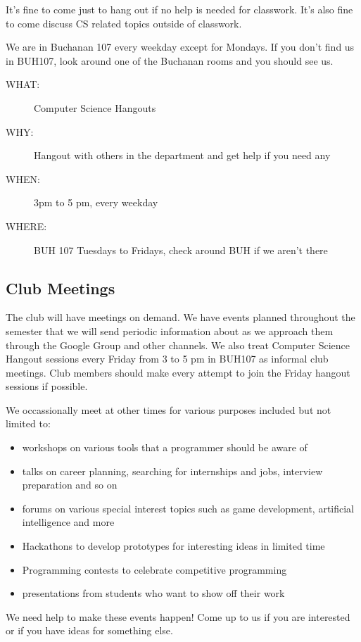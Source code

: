 It's fine to come just to hang out if no help is needed for classwork. It's
also fine to come discuss CS related topics outside of classwork.

We are in Buchanan 107 every weekday except for Mondays. If you don't find us
in BUH107, look around one of the Buchanan rooms and you should see us.

\begin{description}
\item[{WHAT:}] Computer Science Hangouts
\item[{WHY:}] Hangout with others in the department and get help if you need any
\item[{WHEN:}] 3pm to 5 pm, every weekday
\item[{WHERE:}] BUH 107 Tuesdays to Fridays, check around BUH if we aren't there
\end{description}

\subsection{Club Meetings}
\label{sec:orgheadline6}

The club will have meetings on demand. We have events planned throughout the
semester that we will send periodic information about as we approach them
through the Google Group and other channels. We also treat Computer Science
Hangout sessions every Friday from 3 to 5 pm in BUH107 as informal club
meetings. Club members should make every attempt to join the Friday hangout
sessions if possible.

We occassionally meet at other times for various purposes included but not
limited to:
\begin{itemize}
\item workshops on various tools that a programmer should be aware of
\item talks on career planning, searching for internships and jobs, interview
preparation and so on
\item forums on various special interest topics such as game development,
artificial intelligence and more
\item Hackathons to develop prototypes for interesting ideas in limited time
\item Programming contests to celebrate competitive programming
\item presentations from students who want to show off their work
\end{itemize}

We need help to make these events happen! Come up to us if you are interested
or if you have ideas for something else.

